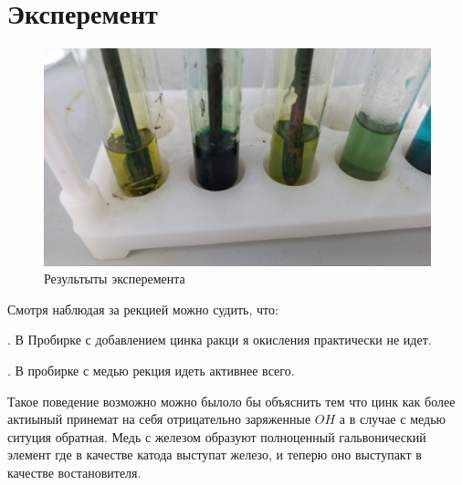 \section{Эксперемент}
\begin{figure}[h]
    \centering
    \includegraphics[width=1\linewidth]{Ex_3/Ex_3_1.jpg}
     \caption{Результыты эксперемента}
    \label{Ex_3_1}
\end{figure}

Смотря наблюдая за рекцией можно судить, что: 

. В Пробирке с добавлением цинка ракци я окисления практически не идет.

. В пробирке с медью рекция идеть активнее всего.

Такое поведение возможно можно былоло бы объяснить 
тем что цинк как более актиыный принемат на себя отрицательно заряженные $OH$
а в случае с медью ситуция обратная. Медь с железом образуют полноценный 
гальвонический элемент где в качестве катода выступат железо, и теперю 
оно выступакт в качестве востановителя.




